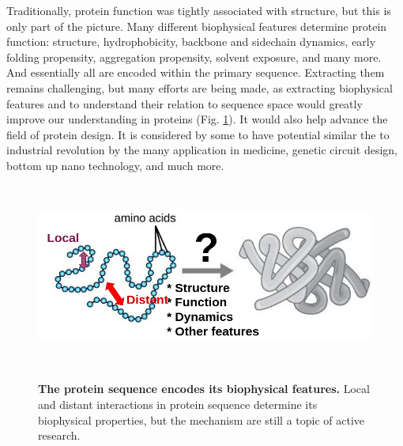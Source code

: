 Traditionally, 
protein function was tightly associated with structure,
but this is only part of the picture.
Many different biophysical features determine protein function:
structure,
hydrophobicity,
backbone and sidechain dynamics,
early folding propensity,
aggregation propensity,
solvent exposure,
and many more.
And essentially all are encoded within the primary sequence.
Extracting them remains challenging, but many efforts are being made,
as extracting biophysical features and to understand their relation to sequence space would greatly improve our understanding in proteins (Fig. \ref{fig:sequence_feature_relation}).
It would also help advance the field of protein design.
It is considered by some to have potential similar the to industrial revolution by the many application in 
medicine,
genetic circuit design,
bottom up nano technology,
and much more.


~\begin{figure}[h!]
	\includegraphics[width=\linewidth]{./literature_review/feature_prediction/biophysical_landscape/img/feature_prediction.png}
	\caption{\textbf{The protein sequence encodes its biophysical features.}
Local and distant interactions in protein sequence determine its biophysical properties,
but the mechanism are still a topic of active research.
}	
	\label{fig:sequence_feature_relation}
~\end{figure}

